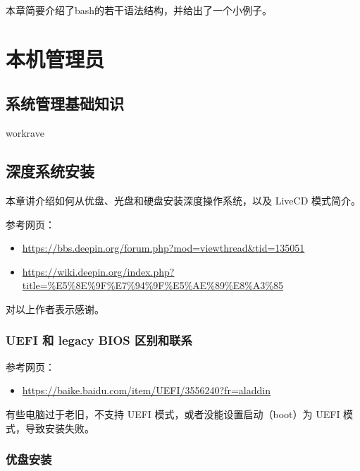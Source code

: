 \documentclass[doctor,openright,twoside]{sjtuthesis}
\newif\ifusepartquote
\newcommand{\thepartquote}{}
\newcommand{\thepartquoteauthor}{}
\newcommand{\partquote}[2]{\ifusepartquote\renewcommand{\thepartquote}{#1}\renewcommand{\thepartquoteauthor}{#2}\fi}
\newif\ifusepartintro
\newcommand{\thepartintro}{}
\newcommand{\partintro}[1]{\ifusepartintro\renewcommand{\thepartintro}{#1}\fi}
\providecommand{\tightlist}{%
    \setlength{\itemsep}{0pt}\setlength{\parskip}{0pt}}
\theoremstyle{plain}
\theoremstyle{definition}
\theoremstyle{remark}
\theoremstyle{ocrenumbox}
\theoremstyle{plain}
\begin{document}
本章简要介绍了bash的若干语法结构，并给出了一个小例子。

\partquote{一屋不扫，何以扫天下}{出处《习惯说》}
\partintro{
本部分介绍软件安装、用户管理、磁盘管理等基础知识，为后续工作打牢基础。
}

\hypertarget{part:local-admin}{%
\part{本机管理员}\label{part:local-admin}}

\hypertarget{section-110}{%
\chapter{系统管理基础知识}\label{section-110}}

workrave

\hypertarget{deepin-install}{%
\chapter{深度系统安装}\label{deepin-install}}

本章讲介绍如何从优盘、光盘和硬盘安装深度操作系统，以及 LiveCD 模式简介。

参考网页：

\begin{itemize}
\tightlist
\item
  \url{https://bbs.deepin.org/forum.php?mod=viewthread\&tid=135051}
\item
  \url{https://wiki.deepin.org/index.php?title=\%E5\%8E\%9F\%E7\%94\%9F\%E5\%AE\%89\%E8\%A3\%85}
\end{itemize}

对以上作者表示感谢。

\hypertarget{uefi--legacy-bios-}{%
\section{UEFI 和 legacy BIOS 区别和联系}\label{uefi--legacy-bios-}}

参考网页：

\begin{itemize}
\tightlist
\item
  \url{https://baike.baidu.com/item/UEFI/3556240?fr=aladdin}
\end{itemize}

有些电脑过于老旧，不支持 UEFI 模式，或者没能设置启动（boot）为 UEFI 模式，导致安装失败。

\hypertarget{section-111}{%
\section{优盘安装}\label{section-111}}
\end{document}
